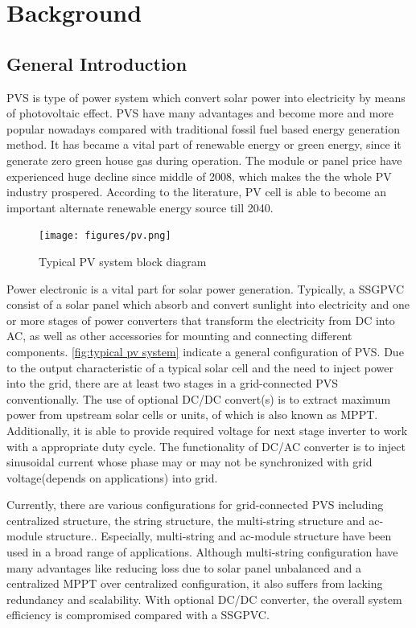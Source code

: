 \chapter{Background}\label{ch:background}

\section{General Introduction}
\gls{PVS} is type of power system which convert solar power into electricity by means of photovoltaic effect. \gls{PVS} have many advantages and become more and more popular nowadays compared with traditional fossil fuel based energy generation method. It has became a vital part of renewable energy or green energy, since it generate zero green house gas during operation. The module or panel price have experienced huge decline since middle of 2008\cite{Bazilian2013329}, which makes the the whole \gls{PV} industry prospered. According to the literature, \gls{PV} cell is able to become an important alternate renewable energy source till 2040\cite{RN3}. 
\begin{figure}[b]
    \centering
    \texttt{[image: figures/pv.png]}
    \caption{Typical PV system block diagram}
    \label{fig:typical pv system}
\end{figure}

Power electronic is a vital part for solar power generation. Typically, a \gls{SSGPVC} consist of a solar panel which absorb and convert sunlight into electricity and one or more stages of power converters that transform the electricity from \gls{DC} into \gls{AC}, as well as other accessories for mounting and connecting different components. \vref{fig:typical pv system} indicate a general configuration of \gls{PVS}. Due to the output characteristic of a typical solar cell and the need to inject power into the grid, there are at least two stages in a grid-connected PVS conventionally. The use of optional DC/DC convert(s) is to extract maximum power from upstream solar cells or units, of which is also known as \gls{MPPT}. Additionally, it is able to provide required voltage for next stage inverter to work with a appropriate duty cycle. The functionality of DC/AC converter is to inject sinusoidal current whose phase may or may not be synchronized with grid voltage(depends on applications) into grid. 

Currently, there are various configurations for grid-connected \gls{PVS} including centralized structure, the string structure, the multi-string structure and ac-module structure.\cite{5540302}. Especially, multi-string and ac-module structure have been used in a broad range of applications. Although multi-string configuration have many advantages like reducing loss due to solar panel unbalanced and a centralized \gls{MPPT} over centralized configuration, it also suffers from lacking redundancy and scalability. With optional DC/DC converter, the overall system efficiency is compromised compared with a \gls{SSGPVC}. 

